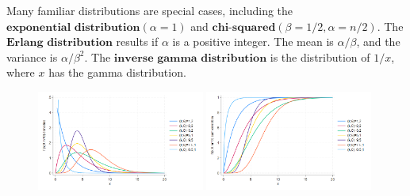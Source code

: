 \documentclass[a4paper,12pt]{article}
\begin{document}
Many familiar distributions are special cases, including the $\textbf{exponential distribution} (\alpha = 1)$ and
$\textbf{chi-squared} (\beta = 1/2 , \alpha = n/2 )$. The $\textbf{Erlang distribution}$ results if $\alpha$ is a positive integer. The mean is
$\alpha/\beta$, and the variance is $\alpha/\beta^{2}$. The $\textbf{inverse gamma distribution}$ is the distribution of $1/x$, where $x$ has the gamma distribution.
\begin{figure}[H]
\begin{center}
{\includegraphics[width=0.49\textwidth]{figures/gamma_pdf}
\includegraphics[width=0.49\textwidth]{figures/gamma_cdf}}\label{f2}
\end{center}
\end{figure}
\end{document}
